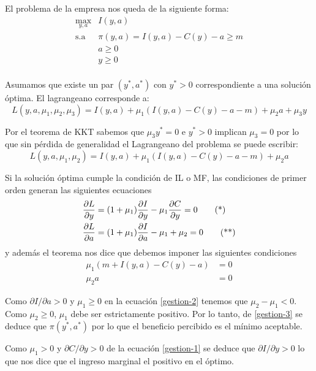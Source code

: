 \begin{solucion}
El problema de la empresa nos queda de la siguiente forma: 
\begin{equation*}
	\begin{array}{cl}
	\displaystyle \max_{y,a} & I(y,a)				    	        \\
	\text{s.a}				 & \pi(y,a) = I(y,a) - C(y) - a \geq m  \\
							 & a \geq 0 					        \\
							 & y \geq 0						        \\
	\end{array}
\end{equation*}

Asumamos que existe un par $(y^*,a^*)$ con $y^*>0$ correspondiente a una soluci\'on \'optima. El lagrangeano corresponde a:
$$L(y,a,\mu_1,\mu_2,\mu_3) = I(y,a) + \mu_1 (I(y,a)-C(y)-a-m) + \mu_2 a + \mu_3 y  $$

Por el teorema de KKT sabemos que $\mu_3 y^* = 0$ e $y^*>0$ implican $\mu_3 = 0$ por lo que sin p\'erdida de generalidad el Lagrangeano del problema se puede escribir:
$$L(y,a,\mu_1,\mu_2) = I(y,a) + \mu_1 (I(y,a)-C(y)-a-m) + \mu_2 a$$

Si la soluci\'on \'optima cumple la condici\'on de IL o MF, las condiciones de primer orden generan las siguientes ecuaciones
\begin{align}
\frac{\partial L}{\partial y} &= (1+\mu_1)\frac{\partial I}{\partial y} - \mu_1 \frac{\partial C}{\partial y} = 0 \label{gestion-1} \tag{*} \\
\frac{\partial L}{\partial a} &= (1+\mu_1)\frac{\partial I}{\partial a} - \mu_1 + \mu_2 = 0 \label{gestion-2} \tag{**}
\end{align}
y adem\'as el teorema nos dice que debemos imponer las siguientes condiciones
\begin{align}
\mu_1 (m+I(y,a)-C(y)-a) &= 0 \label{gestion-3} \tag{***}\\
\mu_2 a &= 0 \nonumber
\end{align}

Como $\partial I / \partial a > 0$ y $\mu_1 \geq 0$ en la ecuaci\'on \eqref{gestion-2} tenemos que $\mu_2 - \mu_1 < 0$. Como $\mu_2 \geq 0$, $\mu_1$ debe ser estrictamente positivo. Por lo tanto, de \eqref{gestion-3} se deduce que $\pi(y^*,a^*)$ por lo que el beneficio percibido es el m\'inimo aceptable.

Como $\mu_1>0$ y $\partial C / \partial y > 0$ de la ecuaci\'on \eqref{gestion-1} se deduce que $\partial I / \partial y > 0$ lo que nos dice que el ingreso marginal el positivo en el \'optimo. 


\end{solucion}
